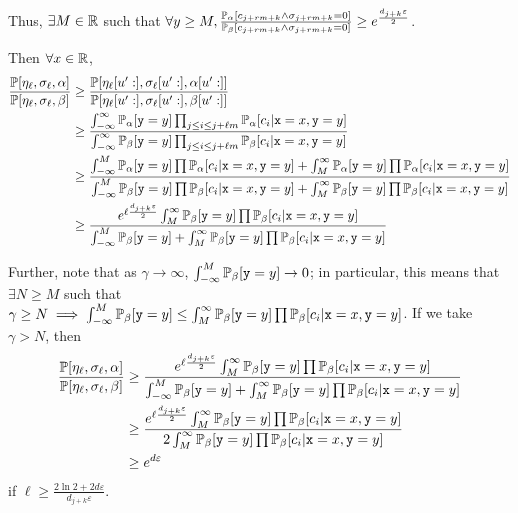 Thus, $\exists M\in \mathbb{R}$ such that $\forall y\geq M, \frac{\mathbb{P}_\alpha[c_{j+rm+k}\land \sigma_{j+rm+k}=0]}{\mathbb{P}_\beta[c_{j+rm+k}\land\sigma_{j+rm+k}=0]}\geq e^{\frac{d_{j+k}\varepsilon}{2}}$. 

Then $\forall x\in \mathbb{R}$, \begin{align*}
	\frac{\mathbb{P}[\eta_\ell, \sigma_\ell, \alpha]}{\mathbb{P}[\eta_\ell, \sigma_\ell, \beta]}&\geq \frac{\mathbb{P}[\eta_\ell[u':], \sigma_\ell[u':], \alpha[u':]]}{\mathbb{P}[\eta_\ell[u':], \sigma_\ell[u':], \beta[u':]]}\\
	&\geq \frac{\int_{-\infty}^\infty \mathbb{P}_\alpha[\texttt{y}=y]\prod_{j\leq i\leq j+\ell m}\mathbb{P}_\alpha[c_i|\texttt{x}=x, \texttt{y}=y]}{\int_{-\infty}^\infty \mathbb{P}_\beta[\texttt{y}=y]\prod_{j\leq i\leq j+\ell m}\mathbb{P}_\beta[c_i|\texttt{x}=x, \texttt{y}=y]}\\
	&\geq \frac{\int_{-\infty}^M \mathbb{P}_\alpha[\texttt{y}=y]\prod\mathbb{P}_\alpha[c_i|\texttt{x}=x, \texttt{y}=y]+\int_{M}^\infty \mathbb{P}_\alpha[\texttt{y}=y]\prod\mathbb{P}_\alpha[c_i|\texttt{x}=x, \texttt{y}=y]}{\int_{-\infty}^M \mathbb{P}_\beta[\texttt{y}=y]\prod\mathbb{P}_\beta[c_i|\texttt{x}=x, \texttt{y}=y]+\int_{M}^\infty \mathbb{P}_\beta[\texttt{y}=y]\prod\mathbb{P}_\beta[c_i|\texttt{x}=x, \texttt{y}=y]}\\
	&\geq \frac{e^{\ell\frac{d_{j+k}\varepsilon}{2}}\int_{M}^\infty \mathbb{P}_\beta[\texttt{y}=y]\prod\mathbb{P}_\beta[c_i|\texttt{x}=x, \texttt{y}=y]}{\int_{-\infty}^M \mathbb{P}_\beta[\texttt{y}=y]+\int_{M}^\infty \mathbb{P}_\beta[\texttt{y}=y]\prod\mathbb{P}_\beta[c_i|\texttt{x}=x, \texttt{y}=y]}
\end{align*}

Further, note that as $\gamma\to \infty$, $\int_{-\infty}^M \mathbb{P}_\beta[\texttt{y}=y] \to 0$; in particular, this means that $\exists N\geq M$ such that $\gamma\geq N\implies \int_{-\infty}^M \mathbb{P}_\beta[\texttt{y}=y]\leq \int_{M}^\infty \mathbb{P}_\beta[\texttt{y}=y]\prod\mathbb{P}_\beta[c_i|\texttt{x}=x, \texttt{y}=y]$. If we take $\gamma > N$, then \begin{align*}
	\frac{\mathbb{P}[\eta_\ell, \sigma_\ell, \alpha]}{\mathbb{P}[\eta_\ell, \sigma_\ell, \beta]}&\geq\frac{e^{\ell\frac{d_{j+k}\varepsilon}{2}}\int_{M}^\infty \mathbb{P}_\beta[\texttt{y}=y]\prod\mathbb{P}_\beta[c_i|\texttt{x}=x, \texttt{y}=y]}{\int_{-\infty}^M \mathbb{P}_\beta[\texttt{y}=y]+\int_{M}^\infty \mathbb{P}_\beta[\texttt{y}=y]\prod\mathbb{P}_\beta[c_i|\texttt{x}=x, \texttt{y}=y]}\\
	&\geq \frac{e^{\ell\frac{d_{j+k}\varepsilon}{2}}\int_{M}^\infty \mathbb{P}_\beta[\texttt{y}=y]\prod\mathbb{P}_\beta[c_i|\texttt{x}=x, \texttt{y}=y]}{2\int_{M}^\infty \mathbb{P}_\beta[\texttt{y}=y]\prod\mathbb{P}_\beta[c_i|\texttt{x}=x, \texttt{y}=y]}\\
	&\geq e^{d\varepsilon}
\end{align*}
if $\ell\geq \frac{2\ln2+2d\varepsilon}{d_{j+k}\varepsilon}$.


